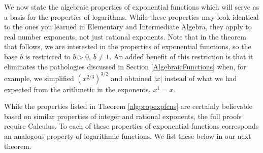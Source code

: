\smallskip

We now state the algebraic properties of exponential functions which will serve as a basis for the properties of logarithms.  While these properties may look identical to the ones you learned in Elementary and Intermediate Algebra, they apply to real number exponents, not just rational exponents.  Note that in the theorem that follows, we are interested in the properties of exponential functions, so the base $b$ is restricted to $b > 0$, $b \neq 1$.  An added benefit of this restriction is that it eliminates the pathologies discussed in Section \ref{AlgebraicFunctions} when, for example, we simplified $\left(x^{2/3}\right)^{3/2}$ and obtained $|x|$ instead of what we had expected from the arithmetic in the exponents, $x^{1} = x$. 

\smallskip


\smallskip

While the properties listed in Theorem \ref{algpropexpfcns} are certainly believable based on similar properties of integer and rational exponents, the full proofs require Calculus.  To each of these properties of exponential functions corresponds an analogous property of logarithmic functions.  We list these below in our next theorem.

\smallskip

